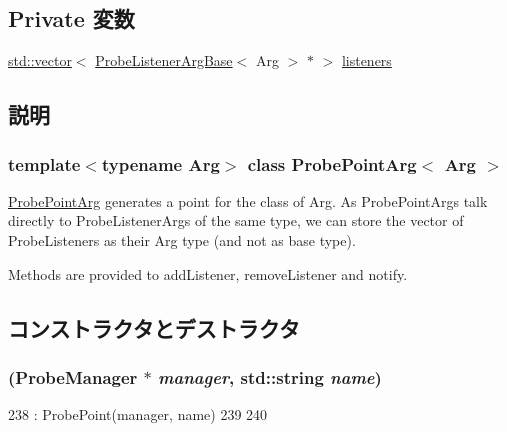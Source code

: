 \subsection*{Private 変数}
\begin{DoxyCompactItemize}
\item 
\hyperlink{classstd_1_1vector}{std::vector}$<$ \hyperlink{classProbeListenerArgBase}{ProbeListenerArgBase}$<$ Arg $>$ $\ast$ $>$ \hyperlink{classProbePointArg_a8ab15f1edc2a743285216937a776d91f}{listeners}
\end{DoxyCompactItemize}


\subsection{説明}
\subsubsection*{template$<$typename Arg$>$ class ProbePointArg$<$ Arg $>$}

\hyperlink{classProbePointArg}{ProbePointArg} generates a point for the class of Arg. As ProbePointArgs talk directly to ProbeListenerArgs of the same type, we can store the vector of ProbeListeners as their Arg type (and not as base type).

Methods are provided to addListener, removeListener and notify. 

\subsection{コンストラクタとデストラクタ}
\hypertarget{classProbePointArg_a7ccfa6bf8a648c110ae7ec6e360c4e74}{
\subsubsection[{ProbePointArg}]{ ({\bf ProbeManager} $\ast$ {\em manager}, \/  std::string {\em name})}}
\label{classProbePointArg_a7ccfa6bf8a648c110ae7ec6e360c4e74}



\begin{DoxyCode}
238         : ProbePoint(manager, name)
239     {
240     }
\end{DoxyCode}


